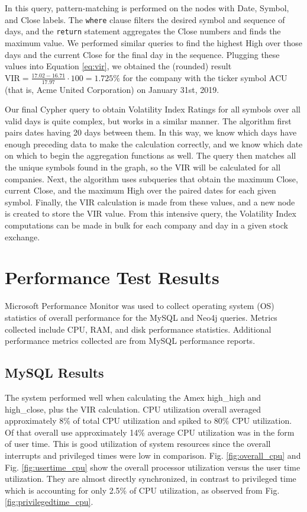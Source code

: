 \documentclass{IEEEtran}
\begin{document}
In this query, pattern-matching is performed on the nodes with Date, Symbol, and Close labels. The \texttt{where} clause filters the desired symbol and sequence of days, and the \texttt{return} statement aggregates the Close numbers and finds the maximum value. We performed similar queries to find the highest High over those days and the current Close for the final day in the sequence. Plugging these values into Equation \ref{eq:vir}, we obtained the (rounded) result $\text{VIR} = \frac{17.02 - 16.71}{17.97}\cdot 100 = 1.725\%$ for the company with the ticker symbol ACU (that is, Acme United Corporation) on January 31st, 2019.   

Our final Cypher query to obtain Volatility Index Ratings for all symbols over all valid days is quite complex, but works in a similar manner. The algorithm first pairs dates having 20 days between them. In this way, we know which days have enough preceding data to make the calculation correctly, and we know which date on which to begin the aggregation functions as well. The query then matches all the unique symbols found in the graph, so the VIR will be calculated for all companies. Next, the algorithm uses subqueries that obtain the maximum Close, current Close, and the maximum High over the paired dates for each given symbol. Finally, the VIR calculation is made from these values, and a new node is created to store the VIR value. From this intensive query, the Volatility Index computations can be made in bulk for each company and day in a given stock exchange.

\section{Performance Test Results}

Microsoft Performance Monitor was used to collect operating system (OS) statistics of overall performance for the MySQL and Neo4j queries. Metrics collected include CPU, RAM, and disk performance statistics. Additional performance metrics collected are from MySQL performance reports.  

\subsection{MySQL Results}

The system performed well when calculating the Amex high\_high and high\_close, plus the VIR calculation. CPU utilization overall averaged approximately 8\% of total CPU utilization and spiked to 80\% CPU utilization. Of that overall use approximately 14\% average CPU utilization was in the form of user time. This is good utilization of system resources since the overall interrupts and privileged times were low in comparison. Fig. \ref{fig:overall_cpu} and Fig. \ref{fig:usertime_cpu} show the overall processor utilization versus the user time utilization. They are almost directly synchronized, in contrast to privileged time which is accounting for only 2.5\% of CPU utilization, as observed from Fig. \ref{fig:privilegedtime_cpu}.  
\end{document}
